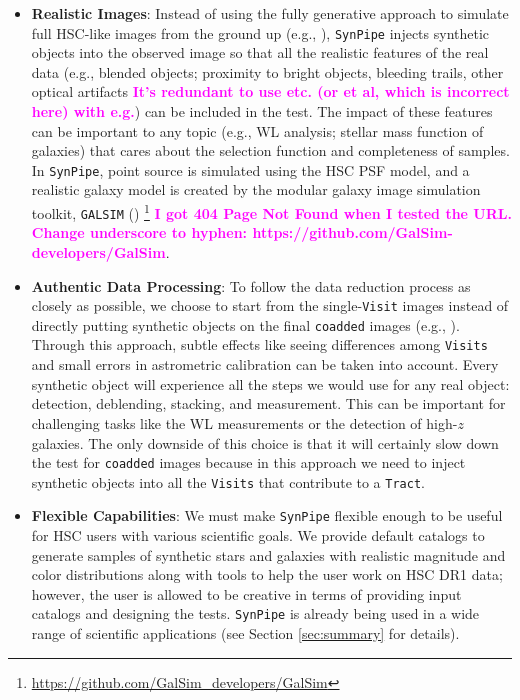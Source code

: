 \documentclass[useamsfonts]{pasj01}
\def\synpipe{\texttt{SynPipe}}
\def\tract{\texttt{Tract}}
\def\visit{\texttt{Visit}}
\def\visits{\texttt{Visits}}
\def\galsim{\texttt{G}{\scriptsize \texttt{AL}}\texttt{S}{\scriptsize \texttt{IM}}}
\newcommand{\susan}[1]{\textcolor{magenta} {\textbf{#1}}}
\begin{document}
    \begin{itemize}

        \item \textbf{Realistic Images}:
            Instead of using the fully generative approach to simulate full HSC-like
            images from the ground up (e.g., \citealt{Chang2015}), \synpipe{} injects
            synthetic objects into the observed image so that all the realistic
            features of the real data (e.g., blended objects; proximity to bright
            objects, bleeding trails, other optical artifacts \susan{It's redundant to use etc. (or et al, which is incorrect here) with e.g.}) can be included
            in the test.
            The impact of these features can be important to any topic (e.g., WL analysis; stellar mass function of galaxies) that cares
            about the selection function and completeness of samples.
            In \synpipe{}, point source is simulated using the HSC PSF model,
            and a realistic galaxy model is created by the modular galaxy image
            simulation toolkit, \galsim{} (\citealt{Rowe2015})
            \footnote{\url{https://github.com/GalSim_developers/GalSim}} \susan{I got 404 Page Not Found when I tested the URL. Change underscore to hyphen: https://github.com/GalSim-developers/GalSim}.

        \item \textbf{Authentic Data Processing}:
            To follow the data reduction process as closely as possible, we choose to
            start from the single-\visit{} images instead of directly putting
            synthetic objects on the final \texttt{coadded} images
            (e.g., \citealt{Suchyta2016}).
            Through this approach, subtle effects like seeing differences among
            \visits{} and small errors in astrometric calibration can be taken
            into account.
            Every synthetic object will experience all the steps we would use for any real object: detection,
            deblending, stacking, and measurement.
            This can be important for challenging tasks like the WL measurements
            or the detection of high-$z$ galaxies.
            The only downside of this choice is that it will certainly slow down the
            test for \texttt{coadded} images because in this approach we need to inject synthetic objects
            into all the \visits{} that contribute to a \tract{}.

        \item \textbf{Flexible Capabilities}:
            We must make \synpipe{} flexible enough to be useful for HSC users with various scientific goals.
            We provide default catalogs to generate samples of synthetic stars
            and galaxies with realistic magnitude and color distributions along with
            tools to help the user work on HSC DR1 data; however, the user is allowed to be creative in terms of providing input catalogs and designing the tests.
             \synpipe{} is already being used in a wide range of
            scientific applications (see Section \ref{sec:summary} for details).

    \end{itemize}
\end{document}
